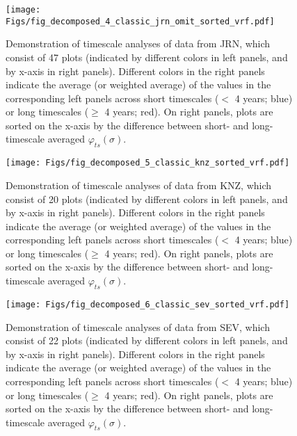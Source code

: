 \documentclass[letterpaper,11pt]{article}
\begin{document}
\begin{figure}
\texttt{[image: Figs/fig\_decomposed\_4\_classic\_jrn\_omit\_sorted\_vrf.pdf]}
\caption{Demonstration of timescale analyses of data from JRN, which consist of 47 plots (indicated by different colors in left panels, and by x-axis in right panels). Different colors in the right panels indicate the average (or weighted average) of the values in the corresponding left panels across short timescales ($<$ 4 years; blue) or long timescales ($\geq$ 4 years; red). On right panels, plots are sorted on the x-axis by the difference between short- and long-timescale averaged $\varphi _{ts} (\sigma)$.}
\end{figure}

\begin{figure}
\texttt{[image: Figs/fig\_decomposed\_5\_classic\_knz\_sorted\_vrf.pdf]}
\caption{Demonstration of timescale analyses of data from KNZ, which consist of 20 plots (indicated by different colors in left panels, and by x-axis in right panels). Different colors in the right panels indicate the average (or weighted average) of the values in the corresponding left panels across short timescales ($<$ 4 years; blue) or long timescales ($\geq$ 4 years; red). On right panels, plots are sorted on the x-axis by the difference between short- and long-timescale averaged $\varphi _{ts} (\sigma)$.}
\end{figure}

\begin{figure}
\texttt{[image: Figs/fig\_decomposed\_6\_classic\_sev\_sorted\_vrf.pdf]}
\caption{Demonstration of timescale analyses of data from SEV, which consist of 22 plots (indicated by different colors in left panels, and by x-axis in right panels). Different colors in the right panels indicate the average (or weighted average) of the values in the corresponding left panels across short timescales ($<$ 4 years; blue) or long timescales ($\geq$ 4 years; red). On right panels, plots are sorted on the x-axis by the difference between short- and long-timescale averaged $\varphi _{ts} (\sigma)$.}
\end{figure}
\end{document}

